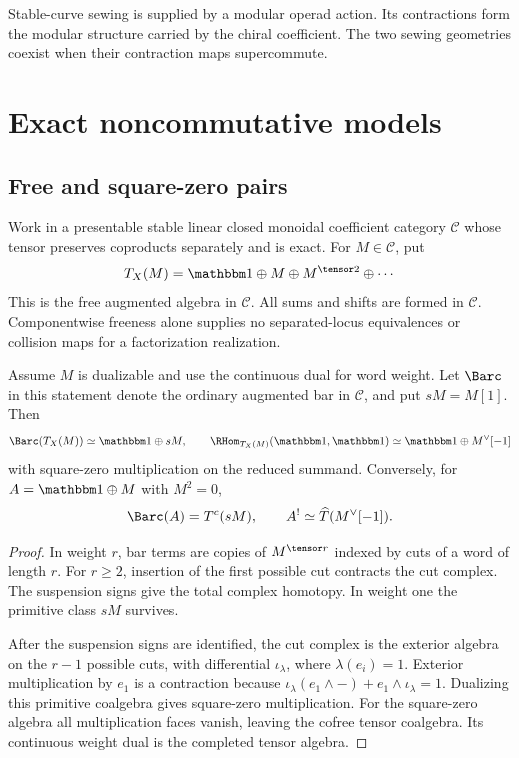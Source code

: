 Stable-curve sewing is supplied by a modular operad action. Its contractions form the modular structure carried by the chiral coefficient. The two sewing geometries coexist when their contraction maps supercommute.

\part{Exact noncommutative models}

\chapter{Free and square-zero pairs}
Work in a presentable stable linear closed monoidal coefficient category $\mathcal C$ whose
tensor preserves coproducts separately and is exact.
For $M\in\mathcal C$, put
\[
 T_X(M)=\mathbbm1\oplus M\oplus M^{\tensor2}\oplus\cdots
\]
This is the free augmented algebra in $\mathcal C$.
All sums and shifts are formed in $\mathcal C$.
Componentwise freeness alone supplies no separated-locus equivalences
or collision maps for a factorization realization.

\begin{theorem}
Assume $M$ is dualizable and use the continuous dual for word weight.
Let $\Barc$ in this statement denote the ordinary augmented bar in
$\mathcal C$, and put $sM=M[1]$. Then
\[
 \Barc(T_X(M))\simeq \mathbbm1\oplus sM,
 \qquad
 \RHom_{T_X(M)}(\mathbbm1,\mathbbm1)
 \simeq \mathbbm1\oplus M^\vee[-1]
\]
with square-zero multiplication on the reduced summand.
Conversely, for $A=\mathbbm1\oplus M$ with $M^2=0$,
\[
 \Barc(A)=T^c(sM),\qquad A^!\simeq \widehat T(M^\vee[-1]).
\]
\end{theorem}
\begin{proof}
In weight $r$, bar terms are copies of $M^{\tensor r}$ indexed by cuts
of a word of length $r$. For $r\ge2$, insertion of the first possible
cut contracts the cut complex. The suspension signs give the total
complex homotopy. In weight one the primitive class $sM$ survives.

After the suspension signs are identified, the cut complex is the
exterior algebra on the $r-1$ possible cuts, with differential
$\iota_\lambda$, where $\lambda(e_i)=1$.
Exterior multiplication by $e_1$ is a contraction because
$\iota_\lambda(e_1\wedge-)+e_1\wedge\iota_\lambda=1$.
Dualizing this primitive coalgebra gives square-zero multiplication.
For the square-zero algebra all multiplication faces vanish, leaving
the cofree tensor coalgebra. Its continuous weight dual is the
completed tensor algebra.
\end{proof}

